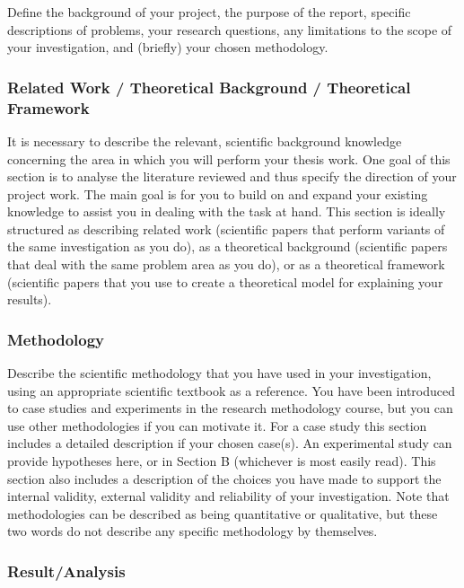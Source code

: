 Define the background of your project, the purpose of the report, specific descriptions of problems, your research questions, any limitations to the scope of your investigation, and (briefly) your chosen methodology.

\subsubsection{Related Work / Theoretical Background / Theoretical Framework}

It is necessary to describe the relevant, scientific background knowledge concerning the area in which you will perform your thesis work. One goal of this section is to analyse the literature reviewed and thus specify the direction of your project work. The main goal is for you to build on and expand your existing knowledge to assist you in dealing with the task at hand. This section is ideally structured as describing related work (scientific papers that perform variants of the same investigation as you do), as a theoretical background (scientific papers that deal with the same problem area as you do), or as a theoretical framework (scientific papers that you use to create a theoretical model for explaining your results).

\subsubsection{Methodology}

Describe the scientific methodology that you have used in your investigation, using an appropriate scientific textbook as a reference. You have been introduced to case studies and experiments in the research methodology course, but you can use other methodologies if you can motivate it. For a case study this section includes a detailed description if your chosen case(s). An experimental study can provide hypotheses here, or in Section B (whichever is most easily read). This section also includes a description of the choices you have made to support the internal validity, external validity and reliability of your investigation.
Note that methodologies can be described as being quantitative or qualitative, but these two words do not describe any specific methodology by themselves.

\subsubsection{Result/Analysis}

